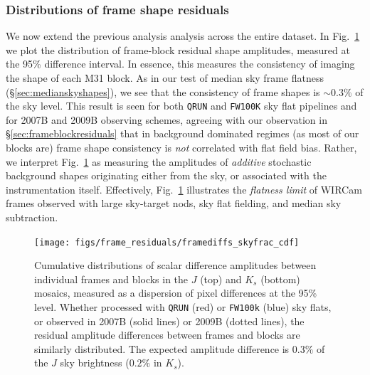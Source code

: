 \documentclass[iop]{emulateapj}
\newcommand{\mycomment}[1]{\textcolor{OliveGreen}{\textit{#1}}} %
\newcommand{\Fig}[1]{Fig.~\ref{fig:#1}}  %
\newcommand{\Sec}[1]{\S\ref{sec:#1}}  %
\begin{document}
\subsubsection{Distributions of frame shape residuals}
\label{sec:frameblockresidualhist}

We now extend the previous analysis analysis across the entire dataset.
In \Fig{frame_diffs_skyfrac} we plot the distribution of frame-block residual shape amplitudes, measured at the 95\% difference interval.
In essence, this measures the consistency of imaging the shape of each M31 block.
As in our test of median sky frame flatness (\Sec{medianskyshapes}), we see that the consistency of frame shapes is $\sim 0.3\%$ of the sky level.
This result is seen for both \texttt{QRUN} and \texttt{FW100K} sky flat pipelines and for 2007B and 2009B observing schemes, agreeing with our observation in \Sec{frameblockresiduals} that in background dominated regimes (as most of our blocks are) frame shape consistency is \emph{not} correlated with flat field bias.
Rather, we interpret \Fig{frame_diffs_skyfrac} as measuring the amplitudes of \emph{additive} stochastic background shapes originating either from the sky, or associated with the instrumentation itself.
Effectively, \Fig{frame_diffs_skyfrac} illustrates the \emph{flatness limit} of WIRCam frames observed with large sky-target nods, sky flat fielding, and median sky subtraction.

\begin{figure}[t]
\centering
\texttt{[image: figs/frame\_residuals/framediffs\_skyfrac\_cdf]}
\caption{Cumulative distributions of scalar difference amplitudes between individual frames and blocks in the $J$ (top) and $K_s$ (bottom) mosaics, measured as a dispersion of pixel differences at the 95\% level.
Whether processed with \texttt{QRUN} (red) or \texttt{FW100k} (blue) sky flats, or observed in 2007B (solid lines) or 2009B (dotted lines), the residual amplitude differences between frames and blocks are similarly distributed.
The expected amplitude difference is $0.3\%$ of the $J$ sky brightness ($0.2\%$ in $K_s$).
}
\label{fig:frame_diffs_skyfrac}
\end{figure}

\end{document}
